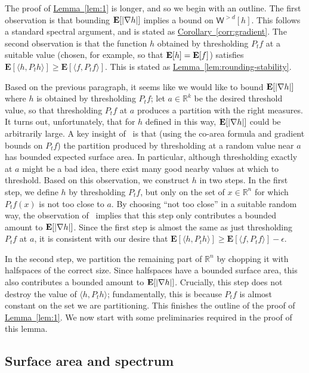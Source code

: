 \documentclass[11pt]{article}
\numberwithin{equation}{section}
\theoremstyle{definition}
\theoremstyle{plain}
\newcommand{\R}{\mathbb R}
\newcommand{\expref}[2]{\hyperref[#2]{#1~\ref{#2}}}
\newcommand{\E}{{\bf E}}
\begin{document}
The proof of \expref{Lemma}{lem:1} is longer, and so we begin with an outline.
The first observation is that
bounding $\E[|\nabla h|]$ implies a bound on $\mathsf{W}^{> d}[h]$.
This follows a standard spectral argument, and is stated as \expref{Corollary}{corr:gradient}.
The second observation is that the function $h$ obtained by thresholding
$P_t f$ at a suitable value (chosen, for example, so that $\E[h] = \E[f]$)
satisfies $\mathbf{E}[\langle h, P_t h\rangle] \ge \mathbf{E}[ \langle f, P_t f\rangle]$. This is stated as \expref{Lemma}{lem:rounding-stability}.

Based on the previous paragraph, it seems like we would like to bound $\E[|\nabla h|]$ where $h$ is obtained
by thresholding $P_t f$; let $a \in \R^k$ be the desired threshold value, so that thresholding $P_t f$ at $a$
produces a partition with the right measures. It turns out, unfortunately, that for $h$ defined in this way,
$\E[|\nabla h|]$ could be
arbitrarily large. A key insight of~\cite{KNOW14} is that (using the co-area formula and gradient bounds on $P_t f$)
the partition produced by thresholding at a random value near $a$ has bounded expected surface area. In particular,
although thresholding exactly at $a$ might be a bad idea,
there exist many good nearby values at which to threshold.
Based on this observation, we construct $h$ in two steps. In the first step, we define $h$ by thresholding $P_t f$,
but only on the set of $x \in \R^n$
for which $P_t f(x)$ is not too close to $a$. By choosing ``not too close'' in a suitable random way, the observation
of~\cite{KNOW14} implies that this step only contributes a bounded amount to $\E[|\nabla h|]$. Since the first step
is almost the same as just thresholding $P_t f$ at $a$, it is consistent with our desire that
$\mathbf{E}[\langle h, P_t h\rangle ]\ge \mathbf{E}[\langle f, P_t f\rangle] - \epsilon$.

In the second step, we partition the remaining part of $\R^n$ by chopping it with halfspaces of the correct size.
Since halfspaces have a bounded surface area, this also contributes a bounded amount to $\E[|\nabla h|]$.
Crucially, this step does not
destroy the value of $\langle h, P_t h\rangle$; fundamentally, this is because $P_t f$ is almost constant on the set
we are partitioning. This finishes the outline of the proof of \expref{Lemma}{lem:1}. We now start with some preliminaries required in the proof of this lemma. 

\subsection{Surface area and spectrum}
\end{document}
